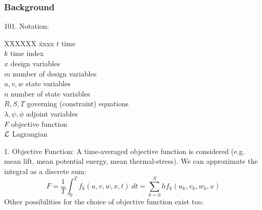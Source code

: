 \documentclass{beamer}
\newenvironment{noheadline}{
    \setbeamertemplate{headline}{}
    \addtobeamertemplate{frametitle}{\vspace*{-1.5\baselineskip}}{}
}{}
\begin{document}
\begin{frame} \frametitle{Background}
  \tiny{
  \begin{block}{101. Notation:}
    \begin{tabbing}
      XXXXXX \= xxxx\kill
      $t$     \> time \\
      $k$     \> time index \\
      $x$     \> design variables \\
      $m$     \> number of design variables \\
      $u,v,w$ \> state variables \\
      $n$  \> number of state variables \\
      $R, S, T$ \> governing (constraint) equations  \\
      $\lambda,\psi,\phi$ \> adjoint variables  \\
      $F$     \> objective function \\
      $\cal{L}$ \> Lagrangian \\
    \end{tabbing}
  \end{block}
  \begin{center}
    \begin{block}{1. Objective Function:}
      A time-averaged objective function is considered (e.g. mean lift,
      mean potential energy, mean thermal-stress). We can approximate
      the integral as a discrete sum:
      \begin{equation}\label{eqn:time-averaged-function}
        F = \frac{1}{T}\int_{0}^T f_k(u,v,w,x,t)~dt=\sum_{k=0}^N h f_k(u_k,v_k,w_k,x)
      \end{equation}
      Other possibilities for the choice of objective function exist
      too.
    \end{block}
  \end{center}
  }
\end{frame}
\end{document}
